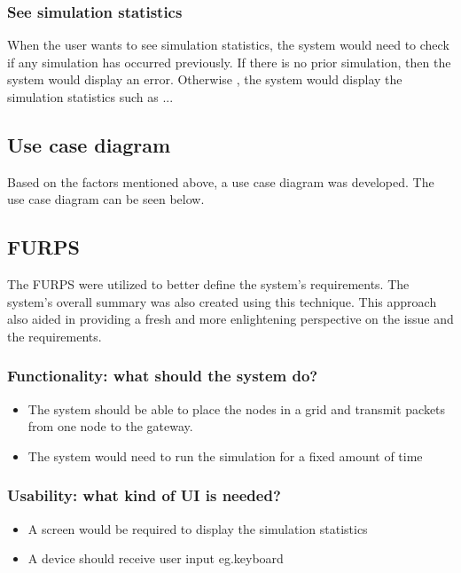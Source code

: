 \subsubsection{See simulation statistics}
When the user wants to see simulation statistics, the system would need to check if any simulation has occurred previously. If there is no prior simulation, then the system would display an error. Otherwise , the system would display the simulation statistics such as ...


\subsection{Use case diagram}
Based on the factors mentioned above, a use case diagram was developed. The use case diagram can be seen below.

\subsection{FURPS}

The FURPS were utilized to better define the system's requirements. The system's overall summary was also created using this technique. This approach also aided in providing a fresh and more enlightening perspective on the issue and the requirements.

\subsubsection{Functionality: what should the system do?}
\begin{itemize}
    \item The system should be able to place the nodes in a grid and transmit packets from one node to the gateway.
    
    
    \item The system would need to run the simulation for a fixed amount of time

    
\end{itemize}

\subsubsection{Usability: what kind of UI is needed?}
\begin{itemize}
    \item A screen would be required to display the simulation statistics
    \item A device should receive user input eg.keyboard
\end{itemize}

